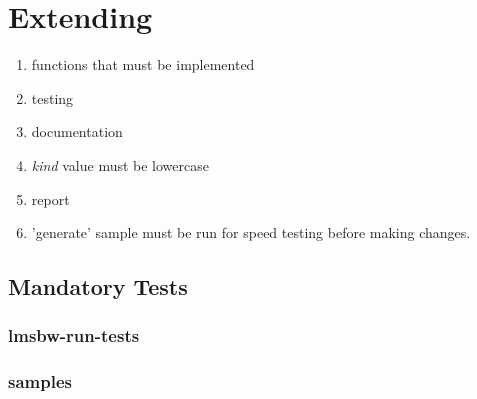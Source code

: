 %
%
%
%
\chapter{Extending \lmsbw}\label{chap:extending}

\begin{enumerate}
\item functions that must be implemented
\item testing
\item documentation
\item \emph{kind} value must be lowercase
\item report
\item 'generate' sample must be run for speed testing before making
  changes.
\end{enumerate}

\section{Mandatory Tests}
\subsection{lmsbw-run-tests}
\subsection{samples}
